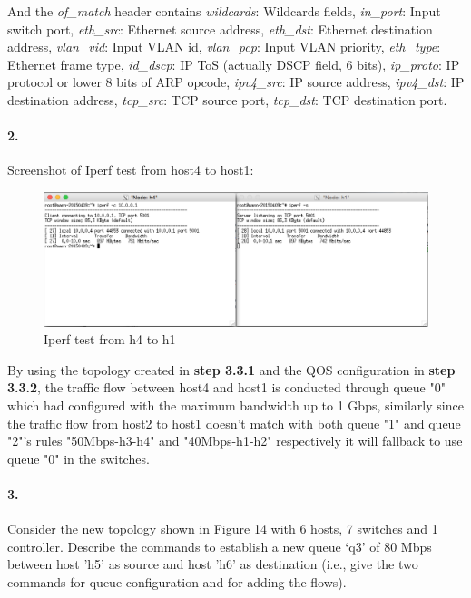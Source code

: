 \documentclass[a4paper]{article}
\begin{document}
And the \emph{of\_match} header contains \emph{wildcards}: Wildcards fields, \emph{in\_port}: Input switch port, \emph{eth\_src}: Ethernet source address, \emph{eth\_dst}: Ethernet destination address, \emph{vlan\_vid}: Input VLAN id, \emph{vlan\_pcp}: Input VLAN priority, \emph{eth\_type}: Ethernet frame type, \emph{id\_dscp}: IP ToS (actually DSCP field, 6 bits), \emph{ip\_proto}: IP protocol or lower 8 bits of ARP opcode, \emph{ipv4\_src}: IP source address, \emph{ipv4\_dst}: IP destination address, \emph{tcp\_src}: TCP source port, \emph{tcp\_dst}: TCP destination port.


\paragraph{2. } Screenshot of Iperf test from host4 to host1:
\begin{figure}[H]
  \centering
    \includegraphics[scale=.47]{iperf_h4_h1.png}
  \caption{Iperf test from h4 to h1}
\end{figure}

By using the topology created in \textbf{step 3.3.1} and the QOS configuration in \textbf{step 3.3.2}, the traffic flow between host4 and host1 is conducted through queue "0" which had configured with the maximum bandwidth up to 1 Gbps, similarly since the traffic flow from host2 to host1 doesn't match with both queue "1" and queue "2"'s rules "50Mbps-h3-h4" and "40Mbps-h1-h2" respectively it will fallback to use queue "0" in the switches.


\paragraph{3. } Consider the new topology shown in Figure 14 with 6 hosts, 7 switches and 1 controller. Describe the commands to establish a new queue ‘q3’ of 80 Mbps between host 'h5' as source and host 'h6' as destination (i.e., give the two commands for queue configuration and for adding the flows).
\end{document}

